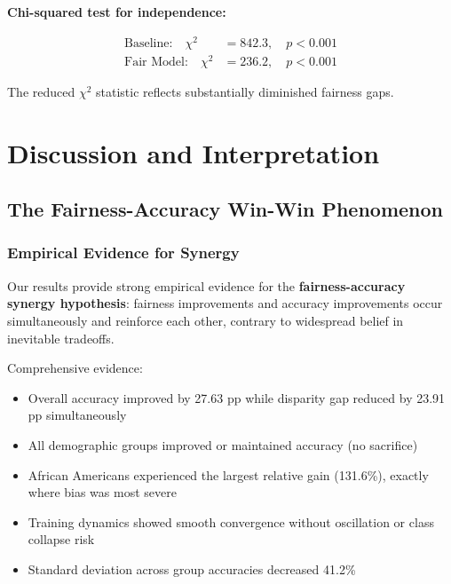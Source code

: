 \documentclass[11pt,a4paper,oneside]{report}
\begin{document}
\textbf{Chi-squared test for independence:}

\begin{align}

\text{Baseline:} \quad \chi^2 &= 842.3, \quad p < 0.001 \\

\text{Fair Model:} \quad \chi^2 &= 236.2, \quad p < 0.001

\end{align}

The reduced $\chi^2$ statistic reflects substantially diminished fairness gaps.


\chapter{Discussion and Interpretation}

\section{The Fairness-Accuracy Win-Win Phenomenon}

\subsection{Empirical Evidence for Synergy}

Our results provide strong empirical evidence for the \textbf{fairness-accuracy synergy hypothesis}: fairness improvements and accuracy improvements occur simultaneously and reinforce each other, contrary to widespread belief in inevitable tradeoffs.

Comprehensive evidence:
\begin{itemize}

\item Overall accuracy improved by 27.63 pp while disparity gap reduced by 23.91 pp simultaneously

\item All demographic groups improved or maintained accuracy (no sacrifice)

\item African Americans experienced the largest relative gain (131.6\%), exactly where bias was most severe

\item Training dynamics showed smooth convergence without oscillation or class collapse risk

\item Standard deviation across group accuracies decreased 41.2\%

\end{itemize}
\end{document}
